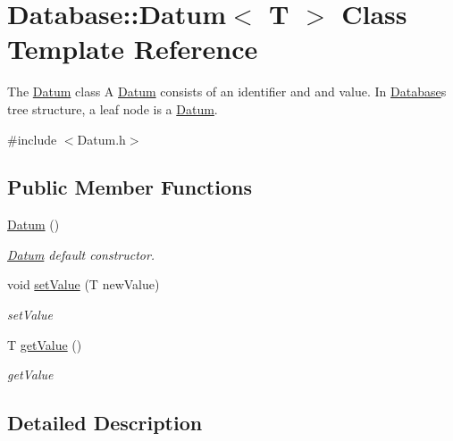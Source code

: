 \hypertarget{classDatabase_1_1Datum}{}\section{Database\+:\+:Datum$<$ T $>$ Class Template Reference}
\label{classDatabase_1_1Datum}


The \hyperlink{classDatabase_1_1Datum}{Datum} class A \hyperlink{classDatabase_1_1Datum}{Datum} consists of an identifier and and value. In \hyperlink{namespaceDatabase}{Database}\textquotesingle{}s tree structure, a leaf node is a \hyperlink{classDatabase_1_1Datum}{Datum}.  




{\ttfamily \#include $<$Datum.\+h$>$}

\subsection*{Public Member Functions}
\begin{DoxyCompactItemize}
\item 
\hyperlink{classDatabase_1_1Datum_ae1880ae165f7a4aef90be6e8cfaa5ff5}{Datum} ()\hypertarget{classDatabase_1_1Datum_ae1880ae165f7a4aef90be6e8cfaa5ff5}{}\label{classDatabase_1_1Datum_ae1880ae165f7a4aef90be6e8cfaa5ff5}

\begin{DoxyCompactList}\small\item\em \hyperlink{classDatabase_1_1Datum}{Datum} default constructor. \end{DoxyCompactList}\item 
void \hyperlink{classDatabase_1_1Datum_a636a8ed59bfcb2947100f8181a9b5c73}{set\+Value} (T new\+Value)
\begin{DoxyCompactList}\small\item\em set\+Value \end{DoxyCompactList}\item 
T \hyperlink{classDatabase_1_1Datum_a1965d14f29d7bc7369ce1d96f529124f}{get\+Value} ()
\begin{DoxyCompactList}\small\item\em get\+Value \end{DoxyCompactList}\end{DoxyCompactItemize}


\subsection{Detailed Description}
